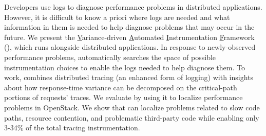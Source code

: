 Developers use logs to diagnose performance problems in distributed
  applications.  However, it is difficult to know a priori where logs
  are needed and what information in them is needed to help diagnose
  problems that may occur in the future.  We present the
  \underline{V}ariance-driven \underline{A}utomated
  \underline{I}nstrumentation \underline{F}ramework (\STAIF{}), which
  runs alongside distributed applications.  In response to
  newly-observed performance problems, \STAIF{} automatically searches
  the space of possible instrumentation choices to enable the logs
  needed to help diagnose them. 
  To work, \STAIF{} combines distributed tracing (an enhanced form of logging) with insights
  about how response-time variance can be decomposed on the
  critical-path portions of requests' traces.  We evaluate \STAIF{} by
  using it to localize performance problems in OpenStack.  We
  show that \STAIF{} can localize problems related to slow code paths,
  resource contention, and problematic third-party code while enabling
  only 3-34\% of the total tracing instrumentation.
